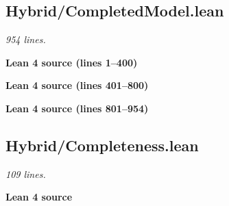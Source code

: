 \documentclass[11pt,a4paper]{article}
\renewcommand{\_}{\origtextunderscore\allowbreak}
\begin{document}
\hypertarget{hybridcompletedmodel.lean}{%
\subsection{Hybrid/CompletedModel.lean}\label{hybridcompletedmodel.lean}}

\emph{954 lines.}

\noindent\textcolor{green!40!black}{\textbf{Lean 4 source (lines 1--400)}}\par\vspace{0.25\baselineskip}


\noindent\textcolor{green!40!black}{\textbf{Lean 4 source (lines 401--800)}}\par\vspace{0.25\baselineskip}


\noindent\textcolor{green!40!black}{\textbf{Lean 4 source (lines 801--954)}}\par\vspace{0.25\baselineskip}


\hypertarget{hybridcompleteness.lean}{%
\subsection{Hybrid/Completeness.lean}\label{hybridcompleteness.lean}}

\emph{109 lines.}

\vspace{0.5\baselineskip}
\noindent\textcolor{green!40!black}{\textbf{Lean 4 source}}\par\vspace{0.25\baselineskip}

\vspace{0.5\baselineskip}
\end{document}

